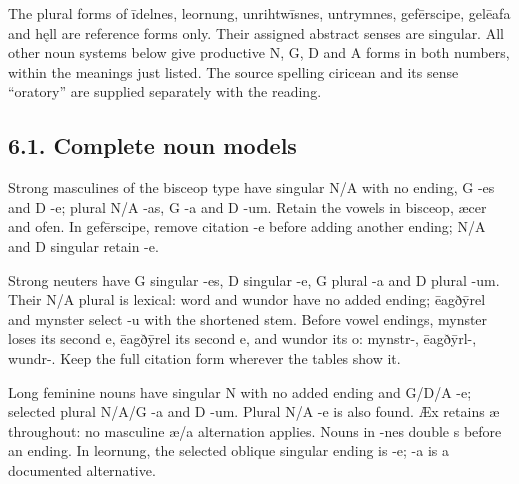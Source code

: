 The plural forms of īdelnes, leornung, unrihtwīsnes, untrymnes, gefērscipe, gelēafa and hęll are reference forms only. Their assigned abstract senses are singular. All other noun systems below give productive N, G, D and A forms in both numbers, within the meanings just listed. The source spelling ciricean and its sense “oratory” are supplied separately with the reading.

\subsection*{6.1. Complete noun models}

Strong masculines of the bisceop type have singular N/\allowbreak{}A with no ending, G -es and D -e; plural N/\allowbreak{}A -as, G -a and D -um. Retain the vowels in bisceop, æcer and ofen. In gefērscipe, remove citation -e before adding another ending; N/\allowbreak{}A and D singular retain -e.

Strong neuters have G singular -es, D singular -e, G plural -a and D plural -um. Their N/\allowbreak{}A plural is lexical: word and wundor have no added ending; ēagðȳrel and mynster select -u with the shortened stem. Before vowel endings, mynster loses its second e, ēagðȳrel its second e, and wundor its o: mynstr-, ēagðȳrl-, wundr-. Keep the full citation form wherever the tables show it.

Long feminine nouns have singular N with no added ending and G/\allowbreak{}D/\allowbreak{}A -e; selected plural N/\allowbreak{}A/\allowbreak{}G -a and D -um. Plural N/\allowbreak{}A -e is also found. Æx retains æ throughout: no masculine æ/\allowbreak{}a alternation applies. Nouns in -nes double s before an ending. In leornung, the selected oblique singular ending is -e; -a is a documented alternative.


